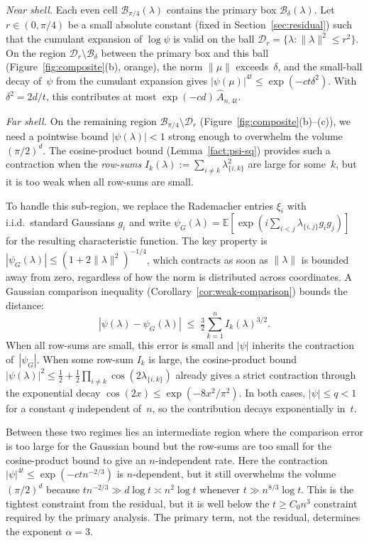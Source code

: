 \documentclass[11pt]{article}
\theoremstyle{definition}
\newcommand{\E}{\mathbb{E}}
\newcommand{\Bbox}{\mathcal{B}}
\newcommand{\Dd}{\mathcal{D}}
\newcommand{\Ahat}{\hat A_{n,4t}}
\begin{document}
\emph{Near shell.} Each even cell \(\Bbox_{\pi/4}(\lambda)\) contains the primary box \(\Bbox_\delta(\lambda)\). Let \(r\in(0,\pi/4)\) be a small absolute constant (fixed in Section~\ref{sec:residual}) such that the cumulant expansion of \(\log\psi\) is valid on the ball \(\Dd_r=\{\lambda:\|\lambda\|^2\le r^2\}\). On the region \(\Dd_r\setminus\Bbox_\delta\) between the primary box and this ball (Figure~\ref{fig:composite}(b), orange), the norm \(\|\mu\|\) exceeds~\(\delta\), and the small-ball decay of~\(\psi\) from the cumulant expansion gives \(|\psi(\mu)|^{4t}\le \exp(-ct\delta^2)\). With \(\delta^2=2d/t\), this contributes at most \(\exp(-cd)\,\Ahat\).

\emph{Far shell.} On the remaining region \(\Bbox_{\pi/4}\setminus\Dd_r\) (Figure~\ref{fig:composite}(b)--(c)), we need a pointwise bound \(|\psi(\lambda)|<1\) strong enough to overwhelm the volume \((\pi/2)^d\). The cosine-product bound (Lemma~\ref{fact:psi-sq}) provides such a contraction when the \emph{row-sums} \(I_k(\lambda):=\sum_{i\ne k}\lambda_{\{i,k\}}^2\) are large for some~\(k\), but it is too weak when all row-sums are small.

To handle this sub-region, we replace the Rademacher entries \(\xi_i\) with i.i.d.\ standard Gaussians \(g_i\) and write \(\psi_G(\lambda)=\E[\exp(i\sum_{i<j}\lambda_{\{i,j\}}g_ig_j)]\) for the resulting characteristic function. The key property is \(|\psi_G(\lambda)|\le(1+2\|\lambda\|^2)^{-1/4}\), which contracts as soon as \(\|\lambda\|\) is bounded away from zero, regardless of how the norm is distributed across coordinates. A Gaussian comparison inequality (Corollary~\ref{cor:weak-comparison}) bounds the distance:
\[
  |\psi(\lambda)-\psi_G(\lambda)|
  \;\le\;
  \tfrac{3}{2}\sum_{k=1}^n I_k(\lambda)^{3/2}.
\]
When all row-sums are small, this error is small and \(|\psi|\) inherits the contraction of~\(|\psi_G|\). When some row-sum \(I_k\) is large, the cosine-product bound \(|\psi(\lambda)|^2\le \frac12+\frac12\prod_{i\ne k}\cos(2\lambda_{\{i,k\}})\) already gives a strict contraction through the exponential decay \(\cos(2x)\le \exp(-8x^2/\pi^2)\). In both cases, \(|\psi|\le q<1\) for a constant \(q\) independent of~\(n\), so the contribution decays exponentially in~\(t\).

Between these two regimes lies an intermediate region where the comparison error is too large for the Gaussian bound but the row-sums are too small for the cosine-product bound to give an \(n\)-independent rate. Here the contraction \(|\psi|^{4t}\le \exp(-ctn^{-2/3})\) is \(n\)-dependent, but it still overwhelms the volume \((\pi/2)^d\) because \(tn^{-2/3}\gg d\log t\asymp n^2\log t\) whenever \(t\gg n^{8/3}\log t\). This is the tightest constraint from the residual, but it is well below the $t \geq C_0 n^3$ constraint required by the primary analysis. The primary term, not the residual, determines the exponent \(\alpha=3\).
\end{document}

